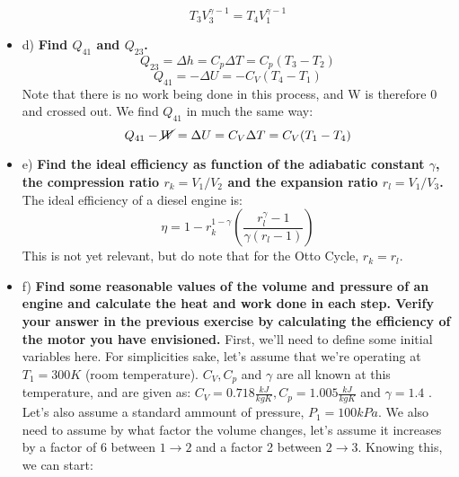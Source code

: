 \documentclass{article}
\begin{document}
\begin{itemize}
\begin{equation*}
        T_3 V_3^{\gamma -1} = T_4 V_1^{\gamma -1}
    \end{equation*}
    \item d) \textbf{Find $Q_{41}$ and $Q_{23}$.}
    \newline 
    \begin{equation*}
        Q_{23} = \Delta h = C_p \Delta T = C_p(T_3 - T_2)
    \end{equation*}
    \begin{equation*}
        Q_{41} = -\Delta U = - C_V (T_4-T_1)
    \end{equation*}
    Note that there is no work being done in this process, and W is therefore 0 and crossed out.\newline
    We find $Q_{41}$ in much the same way:
    \begin{equation*}
        Q_{41} - \cancel{W} = \Delta U = C_V \Delta T = C_V(T_1 - T_4)
    \end{equation*}
   \item e) \textbf{Find the ideal efficiency as function of the adiabatic constant $\gamma$, the compression ratio $r_k = V_1/V_2$ and the expansion ratio $r_l = V_1/V_3$.}
   \newline
   The ideal efficiency of a diesel engine is:
   \begin{equation} \label{ap1}
       \eta = 1 - r_k^{1-\gamma} \left( \frac{r_l^\gamma -1}{\gamma (r_l -1) }\right)
   \end{equation}
   \newline This is not yet relevant, but do note that for the Otto Cycle, $r_k = r_l$. 
   \item f) \textbf{Find some reasonable values of the volume and pressure of an engine and calculate the heat and work done in each step. Verify your answer in the previous exercise by calculating the efficiency of the
motor you have envisioned.}
   \newline
   First, we'll need to define some initial variables here. For simplicities sake, let's assume that we're operating at $T_1 = 300K$ (room temperature). $C_V, C_p$ and $\gamma$ are all known at this temperature, and are given as: $C_V = 0.718 \frac{kJ}{kg K}, C_p = 1.005 \frac{kJ}{kg K}$ and $\gamma = 1.4$ \cite{sourc2}. Let's also assume a standard ammount of pressure, $P_1 = 100 kPa$. We also need to assume by what factor the volume changes, let's assume it increases by a factor of 6 between $1\xrightarrow{} 2$ and a factor 2 between $2\xrightarrow{} 3$.
   \newline
   Knowing this, we can start:

\end{itemize}
\end{document}
